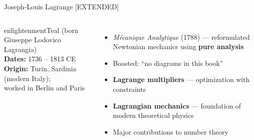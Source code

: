 \begin{frame}[shrink=22]{Joseph-Louis Lagrange \hfill {\small\textcolor{enlightenmentTeal!60}{[EXTENDED]}}}
  \begin{columns}[T]
    \begin{personbox}{enlightenmentTeal}
      {\small (born Giuseppe Lodovico Lagrangia)}\\[3pt]
      \textbf{Dates:} 1736 -- 1813 CE\\
      \textbf{Origin:} Turin, Sardinia (modern Italy);\\
      worked in Berlin and Paris
    \end{personbox}
    \vspace{0.3em}
    \begin{itemize}
      \item \textit{M\'{e}canique Analytique} (1788) --- reformulated Newtonian mechanics using \textbf{pure analysis}
      \item Boasted: ``no diagrams in this book''
      \item \textbf{Lagrange multipliers} --- optimization with constraints
      \item \textbf{Lagrangian mechanics} --- foundation of modern theoretical physics
      \item Major contributions to number theory
    \end{itemize}


    \vspace{0.5em}
  \end{columns}

\end{frame}

